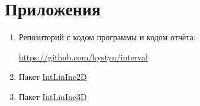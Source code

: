 \section{Приложения} \label{app}

\begin{enumerate}
	\item Репозиторий с кодом программы и кодом отчёта:
	
	\href{https://github.com/kystyn/interval}{https://github.com/kystyn/interval}
	
	\item Пакет \href{http://www.nsc.ru/interval/Programing/MCodes/IntLinInc2D.zip}{IntLinInc2D}	
	
	\item Пакет \href{http://www.nsc.ru/interval/Programing/MCodes/IntLinInc3D.zip}{IntLinInc3D}
\end{enumerate}